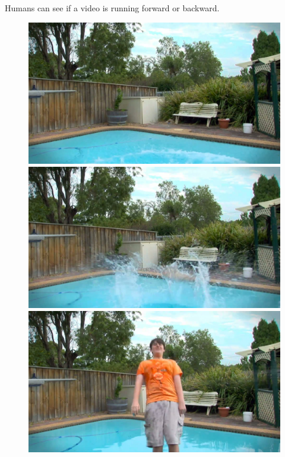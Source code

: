 \documentclass[french]{beamer}
\begin{document}
\begin{frame}
	Humans can see if a video is running forward or backward.
	\newline
	\begin{figure}[h]
		\begin{minipage}[b]{.30\linewidth}
			\includegraphics[width=1.0\textwidth]{im01.jpeg}
		\end{minipage}
		\hspace{5pt}
		\begin{minipage}[b]{0.30\linewidth}
			\includegraphics[width=1.0\textwidth]{im30.jpeg}
		\end{minipage}
		\hspace{5pt}
		\begin{minipage}[b]{0.30\linewidth}
			\includegraphics[width=1.0\textwidth]{im50.jpeg}
		\end{minipage}
		\label{fig:f}
	\end{figure}
	

\end{frame}
\end{document}
